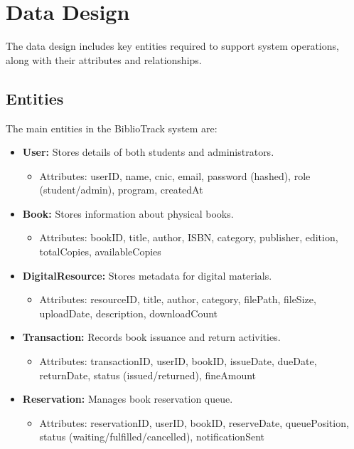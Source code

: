 \documentclass[12pt,a4paper]{report}
\begin{document}
\section{Data Design}
\label{sec:datadesign}

The data design includes key entities required to support system operations, along with their attributes and relationships.

\subsection{Entities}

The main entities in the BiblioTrack system are:

\begin{itemize}
    \item \textbf{User:} Stores details of both students and administrators.
    \begin{itemize}
        \item Attributes: userID, name, cnic, email, password (hashed), role (student/admin), program, createdAt
    \end{itemize}
    
    \item \textbf{Book:} Stores information about physical books.
    \begin{itemize}
        \item Attributes: bookID, title, author, ISBN, category, publisher, edition, totalCopies, availableCopies
    \end{itemize}
    
    \item \textbf{DigitalResource:} Stores metadata for digital materials.
    \begin{itemize}
        \item Attributes: resourceID, title, author, category, filePath, fileSize, uploadDate, description, downloadCount
    \end{itemize}
    
    \item \textbf{Transaction:} Records book issuance and return activities.
    \begin{itemize}
        \item Attributes: transactionID, userID, bookID, issueDate, dueDate, returnDate, status (issued/returned), fineAmount
    \end{itemize}
    
    \item \textbf{Reservation:} Manages book reservation queue.
    \begin{itemize}
        \item Attributes: reservationID, userID, bookID, reserveDate, queuePosition, status (waiting/fulfilled/cancelled), notificationSent
    \end{itemize}
    

\end{itemize}
\end{document}
